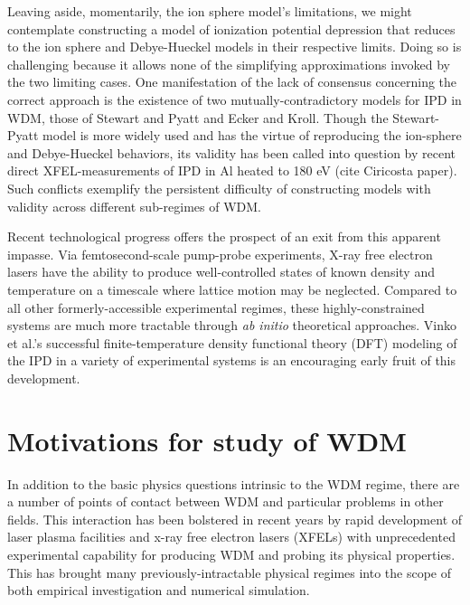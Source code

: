 \documentclass [11pt, proquest, article] {uwthesis}[2016/11/22]
\begin{document}

Leaving aside, momentarily, the ion sphere model's limitations, we might contemplate constructing a model of ionization potential depression that reduces to the ion sphere and Debye-Hueckel models in their respective limits. Doing so is challenging because it allows none of the simplifying approximations invoked by the two limiting cases. One manifestation of the lack of consensus concerning the correct approach is the existence of two mutually-contradictory models for IPD in WDM, those of Stewart and Pyatt \cite{stewart1966lowering} and Ecker and Kroll. \cite{ecker1963lowering} Though the Stewart-Pyatt model is more widely used and has the virtue of reproducing the ion-sphere and Debye-Hueckel behaviors, its validity has been called into question by recent direct XFEL-measurements of IPD in Al heated to 180 eV (cite Ciricosta paper). \cite{ciricosta2012direct, crowley2014continuum} Such conflicts exemplify the persistent difficulty of constructing models with validity across different sub-regimes of WDM.

Recent technological progress offers the prospect of an exit from this apparent impasse. Via femtosecond-scale pump-probe experiments, X-ray free electron lasers have the ability to produce well-controlled states of known density and temperature on a timescale where lattice motion may be neglected. Compared to all other formerly-accessible experimental regimes, these highly-constrained systems are much more tractable through \emph{ab initio} theoretical approaches. Vinko et al.'s successful finite-temperature density functional theory (DFT) modeling of the IPD in a variety of experimental systems is an encouraging early fruit of this development.\cite{vinko2014density}


\section{Motivations for study of WDM}
In addition to the basic physics questions intrinsic to the WDM regime, there are a number of points of contact between WDM and particular problems in other fields. This interaction has been bolstered in recent years by rapid development of laser plasma facilities and x-ray free electron lasers (XFELs) with unprecedented experimental capability for producing WDM and probing its physical properties. This has brought many previously-intractable physical regimes into the scope of both empirical investigation and numerical simulation.  
\end{document}
